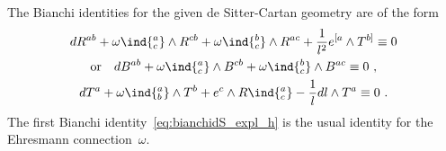 \documentclass[11pt]{article}
\begin{document}
\blankline
The Bianchi identities for the given de Sitter-Cartan geometry 
are of the form
\begin{subequations}
\begin{gather}
	\begin{gathered}
	\label{eq:bianchidS_expl_h}
	dR^{ab} + \omega\ind{^a_c} \wedge R^{cb} + \omega\ind{^b_c} 
	\wedge R^{ac} + \frac{1}{l^2} e^{[a} \wedge T^{b]} \equiv 0 \\
	\text{or}\quad
	dB^{ab} + \omega\ind{^a_c} \wedge B^{cb} + \omega\ind{^b_c} 
	\wedge B^{ac} \equiv 0~,
	\end{gathered}
	\\
	\label{eq:bianchidS_expl_p}
	dT^a + \omega\ind{^a_b} \wedge T^b + e^c \wedge R\ind{_c^a} - 
	\frac{1}{l} dl \wedge T^a \equiv 0~.
\end{gather}
\end{subequations}
The first Bianchi identity~\eqref{eq:bianchidS_expl_h} is the 
usual identity for the Ehresmann connection~$\omega$.
\end{document}
